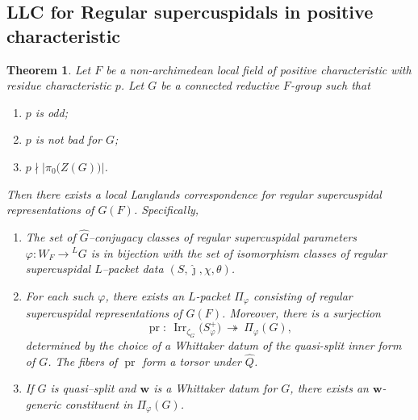 \documentclass[american]{article}
\numberwithin{equation}{section}
\numberwithin{figure}{section}
\theoremstyle{plain}
\newtheorem{theorem}{Theorem}[section]
\theoremstyle{definition}
\theoremstyle{remark}
\DeclareMathOperator{\Irr}{Irr}
\begin{document}
\medskip

\subsection{LLC for Regular supercuspidals in positive characteristic}
\begin{theorem}\label{thm:llc-for-regular}
Let \(F\) be a non-archimedean local field of positive characteristic with residue characteristic \(p\).
Let \(G\) be a connected reductive \(F\)-group such that  
\begin{enumerate}
\item \(p\) is odd;
\item \(p\) is not bad for \(G\);
\item \(p\nmid \lvert\pi_0\bigl(Z(G)\bigr)\rvert\).
\end{enumerate}
Then there exists a local Langlands correspondence for regular supercuspidal representations of \(G(F)\). Specifically,
\begin{enumerate}[label=\textup{(\alph*)}]
\item The set of $\widehat G$--conjugacy classes of regular supercuspidal parameters $\varphi:W_F\to {^LG}$ is in bijection with the set of isomorphism classes of regular supercuspidal $L$--packet data $(S,\hat\jmath,\chi,\theta)$.\vspace{2pt}

\item For each such $\varphi$, there exists an  \(L\)-packet  \(\Pi_\varphi\) consisting of regular supercuspidal representations of \(G(F)\). Moreover, there is a surjection
\[
\operatorname{pr}:\ \Irr_{\zeta_G}\!\bigl(S_\varphi^{+}\bigr)\ \twoheadrightarrow\ \Pi_{\varphi}(G),
\]
determined by the choice of a Whittaker datum of the quasi-split inner form of \(G\). The fibers of \(\operatorname{pr}\)  form a torsor under \(\widehat{Q}\). 
\medskip
\item If $G$ is quasi--split and \(\mathbf w\) is a Whittaker datum for $G$, there exists an \(\mathbf w\)-generic constituent in \(\Pi_\varphi(G)\).

\end{enumerate}

\end{theorem}
\end{document}
